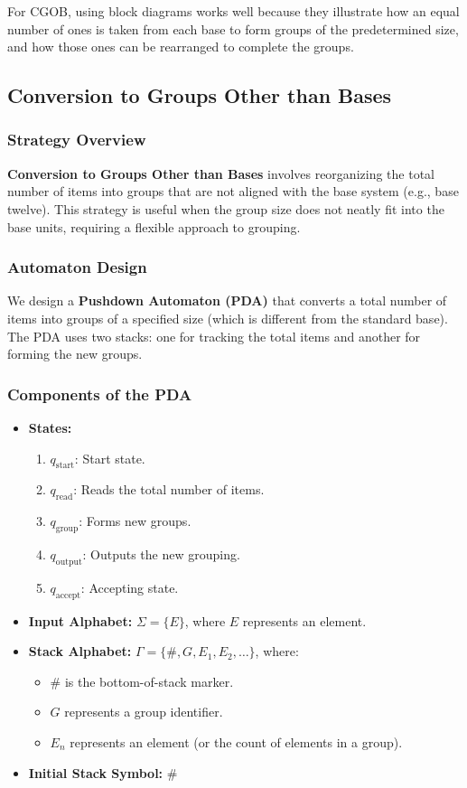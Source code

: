 \documentclass[11pt]{article}
\begin{document}
    For CGOB, using block diagrams works well because they illustrate how an equal number of ones is taken from each base to form groups of the predetermined size, and how those ones can be rearranged to complete the groups.


\subsection*{Conversion to Groups Other than Bases}

\subsubsection*{Strategy Overview}
\textbf{Conversion to Groups Other than Bases} involves reorganizing the total number of items into groups that are not aligned with the base system (e.g., base twelve). This strategy is useful when the group size does not neatly fit into the base units, requiring a flexible approach to grouping.

\subsubsection*{Automaton Design}
We design a \textbf{Pushdown Automaton (PDA)} that converts a total number of items into groups of a specified size (which is different from the standard base). The PDA uses two stacks: one for tracking the total items and another for forming the new groups.

\subsubsection*{Components of the PDA}
\begin{itemize}
    \item \textbf{States:}
    \begin{enumerate}
        \item \(q_{\text{start}}\): Start state.
        \item \(q_{\text{read}}\): Reads the total number of items.
        \item \(q_{\text{group}}\): Forms new groups.
        \item \(q_{\text{output}}\): Outputs the new grouping.
        \item \(q_{\text{accept}}\): Accepting state.
    \end{enumerate}
    \item \textbf{Input Alphabet:} \(\Sigma = \{ E \}\), where \(E\) represents an element.
    \item \textbf{Stack Alphabet:} \(\Gamma = \{ \#, G, E_1, E_2, \ldots \}\), where:
    \begin{itemize}
        \item \(\#\) is the bottom-of-stack marker.
        \item \(G\) represents a group identifier.
        \item \(E_n\) represents an element (or the count of elements in a group).
    \end{itemize}
    \item \textbf{Initial Stack Symbol:} \(\#\)
\end{itemize}
\end{document}
